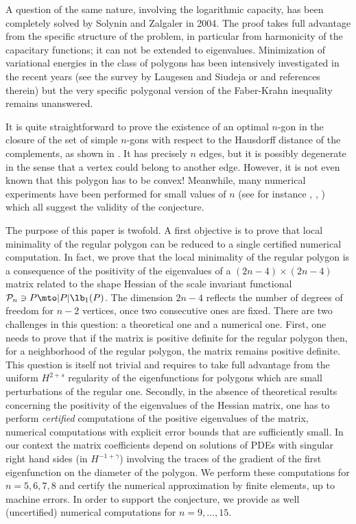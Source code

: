 A question of the same nature, involving the logarithmic capacity, has been completely solved by Solynin and Zalgaler \cite{SoZa04} in 2004. The proof takes full advantage from the specific structure of the problem, in particular from harmonicity of the capa\-citary functions; it can not be extended to eigenvalues. Minimization of variational energies in the class of polygons has been intensively investigated in the recent years (see the survey by Laugesen and Siudeja \cite{LaSi17} or \cite{BuFr21} and references therein) but the very specific polygonal version of the Faber-Krahn inequality remains unanswered.

It is quite straightforward to prove the existence of an optimal $n$-gon in the closure of the set of simple $n$-gons with respect to the Hausdorff distance of the complements, as shown in \cite[Ch.\,3]{henroteigs}. It has precisely $n$ edges, but it is possibly degenerate in the sense that a vertex could belong to another edge. However, it is not even known that this polygon has to be convex! Meanwhile, many numerical experiments have been performed for small values of $n$ (see for instance \cite{AFpolygons}, \cite[Ch.\,1]{beniphd}, \cite{nigam_numerics}) which all suggest the validity of the conjecture.

The purpose of this paper is twofold. A first objective is to prove that local minimality of the regular polygon can be reduced to a single certified numerical computation.
In fact, we prove that the local minimality of the regular polygon is a consequence of the positivity of the eigenvalues of a $(2n-4) \times (2n-4)$ matrix related to the shape Hessian of the scale invariant functional ${\mathcal P}_n \ni P \mto |P|\lb_1(P)$. The dimension $2n-4$ reflects the number of degrees of freedom for $n-2$ vertices, once two consecutive ones are fixed. There are two challenges in this question: a theoretical one and a numerical one. First, one needs to prove that if the matrix is positive definite for the regular polygon then, for a neighborhood of the regular polygon, the matrix remains positive definite. This question is itself not trivial and requires to take full advantage from the uniform $H^{2+s}$ regularity of the eigenfunctions for polygons which are small perturbations of the regular one. Secondly, in the absence of theoretical results concerning the positivity of the eigenvalues of the Hessian matrix, one has to perform {\it certified} computations of the positive eigenvalues of the matrix, \ie numerical computations with explicit error bounds that are sufficiently small. In our context the matrix coefficients depend on solutions of PDEs with singular right hand sides (in $H^{-1+ \gamma}$) involving the traces of the gradient of the first eigenfunction on the diameter of the polygon. We perform these computations for $n= 5, 6, 7, 8$ and certify the numerical approximation by finite elements, up to machine errors. In order to support the conjecture, we provide as well (uncertified) numerical computations for $n=9, \dots, 15$.

